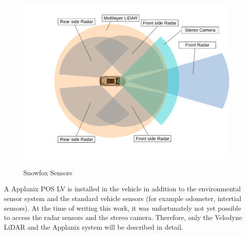 \begin{figure}[!ht]
\caption{Snowfox Sensors}
\includegraphics[width=\columnwidth]{sensors.pdf}
\label{platform}
\end{figure}

A Applanix POS LV is installed in the vehicle in addition to the environmental sensor system and the standard vehicle sensors (for example odometer, intertial sensors).
At the time of writing this work, it was unfortunately not yet possible to access the radar sensors and the stereo camera.
Therefore, only the Velodyne LiDAR and the Applanix system will be described in detail.

